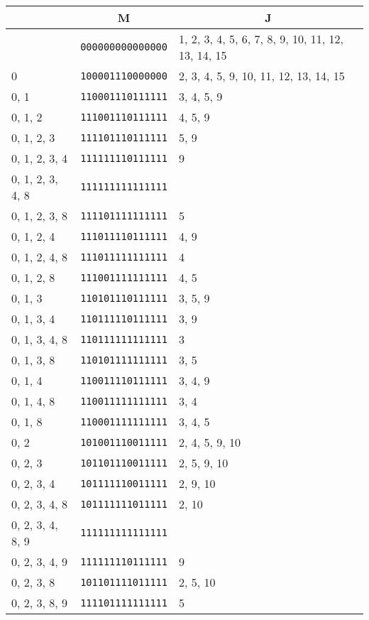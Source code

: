 \documentclass[a4paper,12pt]{article}
\begin{document}
    \begin{longtable}{l|l|l}
        &\multicolumn{1}{c|}{M}&\multicolumn{1}{|c}{J}\\
        \hline
        \endhead
        &\texttt{000000000000000}&1, 2, 3, 4, 5, 6, 7, 8, 9, 10, 11, 12, 13, 14, 15\\
        0&\texttt{100001110000000}&2, 3, 4, 5, 9, 10, 11, 12, 13, 14, 15\\
        0, 1&\texttt{110001110111111}&3, 4, 5, 9\\
        0, 1, 2&\texttt{111001110111111}&4, 5, 9\\
        0, 1, 2, 3&\texttt{111101110111111}&5, 9\\
        0, 1, 2, 3, 4&\texttt{111111110111111}&9\\
        0, 1, 2, 3, 4, 8&\texttt{111111111111111}&\\
        0, 1, 2, 3, 8&\texttt{111101111111111}&5\\
        0, 1, 2, 4&\texttt{111011110111111}&4, 9\\
        0, 1, 2, 4, 8&\texttt{111011111111111}&4\\
        0, 1, 2, 8&\texttt{111001111111111}&4, 5\\
        0, 1, 3&\texttt{110101110111111}&3, 5, 9\\
        0, 1, 3, 4&\texttt{110111110111111}&3, 9\\
        0, 1, 3, 4, 8&\texttt{110111111111111}&3\\
        0, 1, 3, 8&\texttt{110101111111111}&3, 5\\
        0, 1, 4&\texttt{110011110111111}&3, 4, 9\\
        0, 1, 4, 8&\texttt{110011111111111}&3, 4\\
        0, 1, 8&\texttt{110001111111111}&3, 4, 5\\
        0, 2&\texttt{101001110011111}&2, 4, 5, 9, 10\\
        0, 2, 3&\texttt{101101110011111}&2, 5, 9, 10\\
        0, 2, 3, 4&\texttt{101111110011111}&2, 9, 10\\
        0, 2, 3, 4, 8&\texttt{101111111011111}&2, 10\\
        0, 2, 3, 4, 8, 9&\texttt{111111111111111}&\\
        0, 2, 3, 4, 9&\texttt{111111110111111}&9\\
        0, 2, 3, 8&\texttt{101101111011111}&2, 5, 10\\
        0, 2, 3, 8, 9&\texttt{111101111111111}&5\\

\end{longtable}
\end{document}
